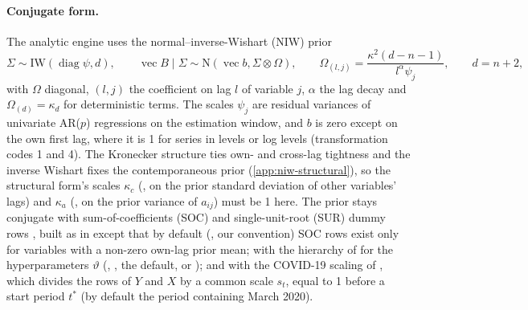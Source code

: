 \paragraph{Conjugate form.} The analytic engine uses the normal--inverse-Wishart (NIW) prior
\citep{kadiyala1997numerical,banbura2010large}
\begin{equation}\label{eq:omega}
  \Sigma \sim \mathrm{IW}(\operatorname{diag}\psi, d), \qquad
  \operatorname{vec} B \mid \Sigma \sim \mathrm{N}(\operatorname{vec} b, \Sigma \otimes \Omega), \qquad
  \Omega_{(l,j)} = \frac{\kappa^2 (d-n-1)}{l^{\alpha}\psi_j}, \qquad d = n + 2,
\end{equation}
with $\Omega$ diagonal, $(l,j)$ the coefficient on lag $l$ of variable $j$, $\alpha$ the lag decay
and $\Omega_{(d)} = \kappa_d$ for deterministic terms. The scales $\psi_j$ are residual variances of
univariate AR($p$) regressions on the estimation window, and $b$ is zero except on the own first
lag, where it is 1 for series in levels or log levels (transformation codes 1 and 4). %
The Kronecker structure ties own- and cross-lag tightness \citep{kadiyala1997numerical} and the
inverse Wishart fixes the contemporaneous prior (\cref{app:niw-structural}), so the structural
form's scales $\kappa_c$ (, on the prior standard deviation of other variables' lags)
and $\kappa_a$ (, on the prior variance of $a_{ij}$) must be 1 here. %
The prior stays conjugate with sum-of-coefficients (SOC) and single-unit-root (SUR) dummy rows
\citep{doan1984forecasting,sims1998bayesian}, built as in \citet{giannone2015prior} except that by
default (, our convention) SOC rows exist only for variables with a
non-zero own-lag prior mean; %
with the hierarchy of \citet{giannone2015prior} for the hyperparameters $\vartheta$
(, , the default, or ); %
and with the COVID-19 scaling of \citet{lenza2022estimate}, which divides the rows of $Y$ and $X$
by a common scale $s_t$, equal to 1 before a start period $t^*$ (by default the period containing
March 2020). %

